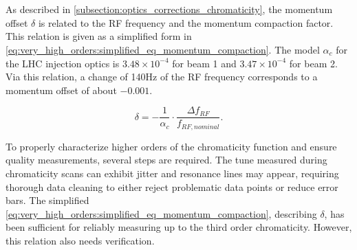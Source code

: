 
\section{}


\subsection{}
\label{subsection:decapoles:chromaticity:measurement}

As described in \cref{subsection:optics_corrections_chromaticity}, the momentum offset $\delta$ is
related to the RF frequency and the momentum compaction factor. This relation is given as a
simplified form in \cref{eq:very_high_orders:simplified_eq_momentum_compaction}. 
The model $\alpha_c$ for the LHC injection optics is $3.48 \times 10^{-4}$ for beam 1 and $3.47
\times 10^{-4}$ for beam 2.  Via this relation, a change of 140Hz of the RF frequency corresponds to
a momentum offset of about $-0.001$.

\begin{equation}
    \delta = -\frac{1}{\alpha_c} \cdot \frac{\Delta f_{RF}}{f_{RF,nominal}}.
    \label{eq:very_high_orders:simplified_eq_momentum_compaction}
\end{equation}

%

To properly characterize higher orders of the chromaticity function and ensure quality measurements,
several steps are required. The tune measured during chromaticity scans can exhibit jitter and
resonance lines may appear, requiring thorough data cleaning to either reject problematic data
points or reduce error bars. The simplified
\cref{eq:very_high_orders:simplified_eq_momentum_compaction}, describing $\delta$, has been
sufficient for reliably measuring up to the third order chromaticity. However, this relation also
needs verification.




